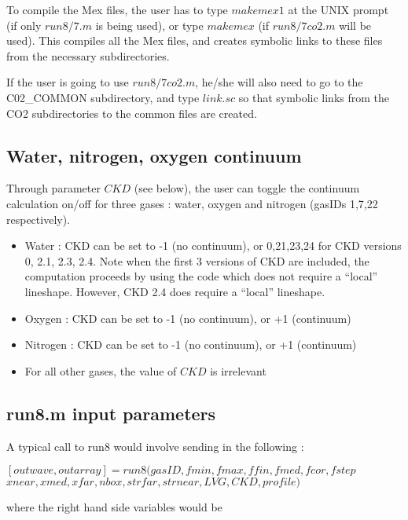 \documentclass[11pt]{article}
\begin{document}
To compile the Mex files, the user has to type $makemex1$ at the UNIX 
prompt (if only $run8/7.m$ is being used), or type $makemex$ 
(if $run8/7co2.m$ will be used). This compiles all the Mex files, and creates 
symbolic links to these files from the necessary subdirectories.

If the user is going to use $run8/7co2.m$, he/she will also need to go to the 
C02\_COMMON subdirectory, and type $link.sc$ so that symbolic links from the
CO2 subdirectories to the common files are created.

\subsection{Water, nitrogen, oxygen continuum}
Through parameter $CKD$ (see below), the user can toggle the continuum 
calculation on/off for three gases : water, oxygen and nitrogen 
(gasIDs 1,7,22 respectively). 

\begin{itemize}
\item Water : CKD can be set to -1 (no continuum), or 0,21,23,24 for CKD 
              versions 0, 2.1, 2.3, 2.4. Note when the first 3 versions of CKD 
              are included, the computation proceeds by using the code which
              does not require a ``local'' lineshape. However, CKD 2.4 does
              require a ``local'' lineshape.
\item Oxygen : CKD can be set to -1 (no continuum), or +1 (continuum)
\item Nitrogen : CKD can be set to -1 (no continuum), or +1 (continuum)
\item For all other gases, the value of $CKD$ is irrelevant
\end{itemize}

\subsection{run8.m input parameters}

A typical call to run8 would involve sending in the following : 

$[outwave,outarray]=run8(gasID,fmin,fmax,ffin,fmed,fcor,fstep$\\
         $xnear,xmed,xfar,nbox,strfar,strnear,LVG,CKD,profile)$

where the right hand side variables would be 
\end{document}
